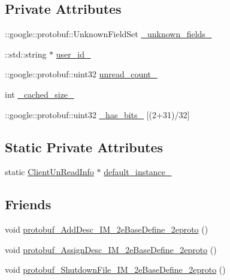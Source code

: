 \subsection*{Private Attributes}
\begin{DoxyCompactItemize}
\item 
\+::google\+::protobuf\+::\+Unknown\+Field\+Set \hyperlink{class_i_m_1_1_base_define_1_1_client_un_read_info_a7cdd7dfd5191d95e4cc24505f00cd882}{\+\_\+unknown\+\_\+fields\+\_\+}
\item 
\+::std\+::string $\ast$ \hyperlink{class_i_m_1_1_base_define_1_1_client_un_read_info_ae50d67d8761fbe558ecba1339cf54f2f}{user\+\_\+id\+\_\+}
\item 
\+::google\+::protobuf\+::uint32 \hyperlink{class_i_m_1_1_base_define_1_1_client_un_read_info_aaf11ec21ef69d622a78c39b8a98afb5f}{unread\+\_\+count\+\_\+}
\item 
int \hyperlink{class_i_m_1_1_base_define_1_1_client_un_read_info_a13727651f95552fca44b779e63caa0d5}{\+\_\+cached\+\_\+size\+\_\+}
\item 
\+::google\+::protobuf\+::uint32 \hyperlink{class_i_m_1_1_base_define_1_1_client_un_read_info_adc902316398321201a9e3777e37e2a7d}{\+\_\+has\+\_\+bits\+\_\+} \mbox{[}(2+31)/32\mbox{]}
\end{DoxyCompactItemize}
\subsection*{Static Private Attributes}
\begin{DoxyCompactItemize}
\item 
static \hyperlink{class_i_m_1_1_base_define_1_1_client_un_read_info}{Client\+Un\+Read\+Info} $\ast$ \hyperlink{class_i_m_1_1_base_define_1_1_client_un_read_info_a25f3dc80a71e8a22c04b0fae41a0069b}{default\+\_\+instance\+\_\+}
\end{DoxyCompactItemize}
\subsection*{Friends}
\begin{DoxyCompactItemize}
\item 
void \hyperlink{class_i_m_1_1_base_define_1_1_client_un_read_info_a9e69e602ccebaa03e642ca43da69b2eb}{protobuf\+\_\+\+Add\+Desc\+\_\+\+I\+M\+\_\+2e\+Base\+Define\+\_\+2eproto} ()
\item 
void \hyperlink{class_i_m_1_1_base_define_1_1_client_un_read_info_a2c5118df3e7622ff896b422106a76fef}{protobuf\+\_\+\+Assign\+Desc\+\_\+\+I\+M\+\_\+2e\+Base\+Define\+\_\+2eproto} ()
\item 
void \hyperlink{class_i_m_1_1_base_define_1_1_client_un_read_info_aa7f5f65378aed5daf4141184fe892bcf}{protobuf\+\_\+\+Shutdown\+File\+\_\+\+I\+M\+\_\+2e\+Base\+Define\+\_\+2eproto} ()
\end{DoxyCompactItemize}


